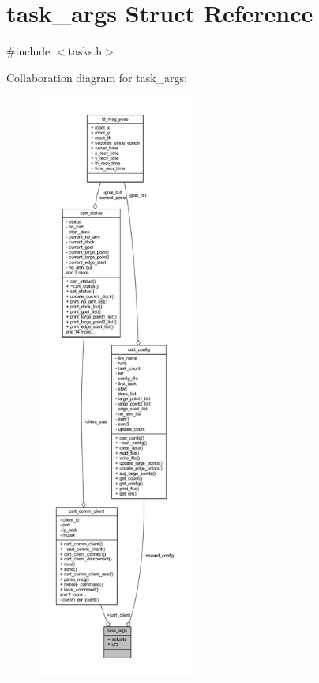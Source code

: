 \hypertarget{structtask__args}{}\section{task\+\_\+args Struct Reference}
\label{structtask__args}


{\ttfamily \#include $<$tasks.\+h$>$}



Collaboration diagram for task\+\_\+args\+:
\nopagebreak
\begin{figure}[H]
\begin{center}
\leavevmode
\includegraphics[height=550pt]{structtask__args__coll__graph}
\end{center}
\end{figure}
